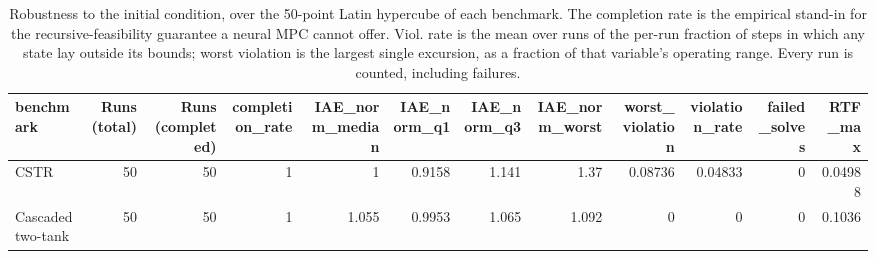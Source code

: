 \begin{table}
\caption{Robustness to the initial condition, over the 50-point Latin hypercube of each benchmark. The completion rate is the empirical stand-in for the recursive-feasibility guarantee a neural MPC cannot offer. Viol. rate is the mean over runs of the per-run fraction of steps in which any state lay outside its bounds; worst violation is the largest single excursion, as a fraction of that variable's operating range. Every run is counted, including failures.}
\label{tab:T2_initial_condition_summary}
\begin{tabular}{lrrrrrrrrrrr}
\toprule
benchmark & Runs (total) & Runs (completed) & completion\_rate & IAE\_norm\_median & IAE\_norm\_q1 & IAE\_norm\_q3 & IAE\_norm\_worst & worst\_violation & violation\_rate & failed\_solves & RTF\_max \\
\midrule
CSTR & 50 & 50 & 1 & 1 & 0.9158 & 1.141 & 1.37 & 0.08736 & 0.04833 & 0 & 0.04988 \\
Cascaded two-tank & 50 & 50 & 1 & 1.055 & 0.9953 & 1.065 & 1.092 & 0 & 0 & 0 & 0.1036 \\
\bottomrule
\end{tabular}
\end{table}
